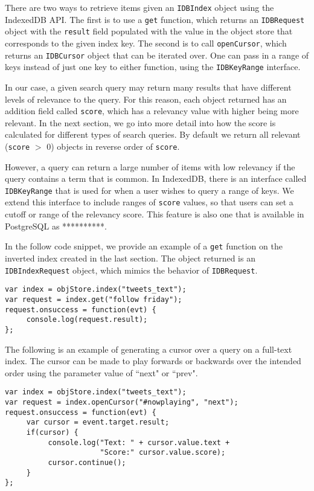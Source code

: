 \documentclass{vldb}
\begin{document}
There are two ways to retrieve items given an \texttt{IDBIndex} object using the IndexedDB API. 
The first is to use a \texttt{get} function, which returns an \texttt{IDBRequest} object with the \texttt{result} field populated with the value in the object store that corresponds to the given index key. The second is to call \texttt{openCursor}, which returns an \texttt{IDBCursor} object that can be iterated over. One can pass in a range of keys instead of just one key to either function, using the \texttt{IDBKeyRange} interface.

In our case, a given search query may return many results that have different levels of relevance to the query. For this reason, each object returned has an addition field called \texttt{score}, which has a relevancy value with higher being more relevant. 
In the next section, we go into more detail into how the score is calculated for different types of search queries.
By default we return all relevant (\texttt{score} $>$ 0) objects in reverse order of \texttt{score}. 

However, a query can return a large number of items with low relevancy if the query contains a term that is common. In IndexedDB, there is an interface called \texttt{IDBKeyRange} that is used for when a user wishes to query a range of keys. We extend this interface to include ranges of \texttt{score} values, so that users can set a cutoff or range of the relevancy score. This feature is also one that is available in PostgreSQL as **********.

In the follow code snippet, we provide an example of a \texttt{get} function on the inverted index created in the last section. The object returned is an \texttt{IDBIndexRequest} object, which mimics the behavior of \texttt{IDBRequest}.

\begin{verbatim}
var index = objStore.index("tweets_text");
var request = index.get("follow friday");
request.onsuccess = function(evt) {
     console.log(request.result);
};
\end{verbatim}

The following is an example of generating a cursor over a query on a full-text index. The cursor can be made to play forwards or backwards over the intended order using the parameter value of ``next" or ``prev".

\begin{verbatim}
var index = objStore.index("tweets_text");
var request = index.openCursor("#nowplaying", "next");
request.onsuccess = function(evt) {
     var cursor = event.target.result;
     if(cursor) {
          console.log("Text: " + cursor.value.text +
                      "Score:" cursor.value.score);
          cursor.continue();
     }
};
\end{verbatim}
\end{document}
